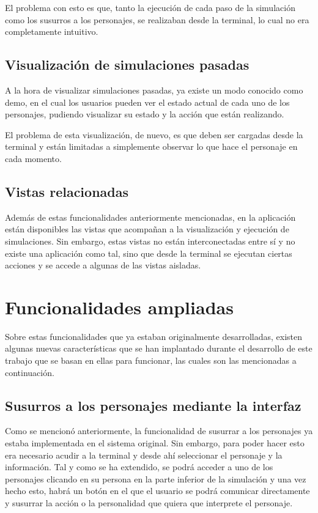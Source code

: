 El problema con esto es que, tanto la ejecución de cada paso de la simulación como los susurros a los personajes, se realizaban desde la terminal, lo cual no era completamente intuitivo.

\subsection{Visualización de simulaciones pasadas}
A la hora de visualizar simulaciones pasadas, ya existe un modo conocido como demo, en el cual los usuarios pueden ver el estado actual de cada uno de los personajes, pudiendo visualizar su estado y la acción que están realizando.

El problema de esta visualización, de nuevo, es que deben ser cargadas desde la terminal y están limitadas a simplemente observar lo que hace el personaje en cada momento. 

\subsection{Vistas relacionadas}
Además de estas funcionalidades anteriormente mencionadas, en la aplicación están disponibles las vistas que acompañan a la visualización y ejecución de simulaciones. 
Sin embargo, estas vistas no están interconectadas entre sí y no existe una aplicación como tal, sino que desde la terminal se ejecutan ciertas acciones y se accede a algunas de las vistas aisladas.

\section{Funcionalidades ampliadas}
Sobre estas funcionalidades que ya estaban originalmente desarrolladas, existen algunas nuevas características que se han implantado durante el desarrollo de este trabajo que se basan en ellas para funcionar, las cuales son las mencionadas a continuación.

\subsection{Susurros a los personajes mediante la interfaz}
Como se mencionó anteriormente, la funcionalidad de susurrar a los personajes ya estaba implementada en el sistema original. Sin embargo, para poder hacer esto era necesario acudir a la terminal y desde ahí seleccionar el personaje y la información. 
Tal y como se ha extendido, se podrá acceder a uno de los personajes clicando en su persona en la parte inferior de la simulación y una vez hecho esto, habrá un botón en el que el usuario se podrá comunicar directamente y susurrar la acción o la personalidad que quiera que interprete el personaje.

